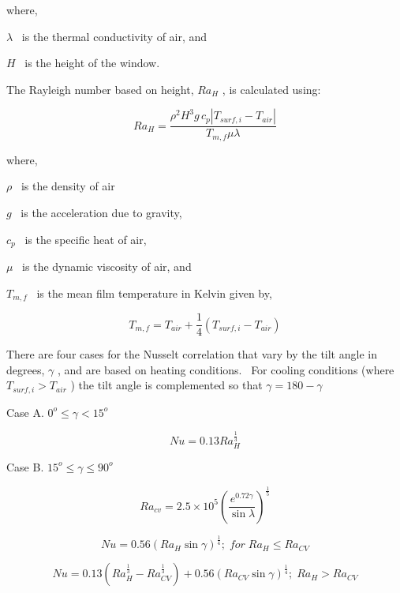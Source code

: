 where,

\(\lambda\) ~is the thermal conductivity of air, and

\(H\) ~is the height of the window.

The Rayleigh number based on height, \(R{a_H}\) , is calculated using:

\begin{equation}
R{a_H} = \frac{{{\rho ^2}{H^3}g\,{c_p}\left| {{T_{surf,i}} - {T_{air}}} \right|}}{{{T_{m,f}}\mu \lambda }}
\end{equation}

where,

\(\rho\) ~is the density of air

\(g\) ~is the acceleration due to gravity,

\({c_p}\) ~is the specific heat of air,

\(\mu\) ~is the dynamic viscosity of air, and

\({T_{m,f}}\) ~is the mean film temperature in Kelvin given by,

\begin{equation}
{T_{m,f}} = {T_{air}} + \frac{1}{4}\left( {{T_{surf,i}} - {T_{air}}} \right)
\end{equation}

There are four cases for the Nusselt correlation that vary by the tilt angle in degrees, \(\gamma\) , and are based on heating conditions.~ For cooling conditions (where \({T_{surf,i}} > {T_{air}}\) ) the tilt angle is complemented so that \(\gamma = 180 - \gamma\)

Case A. \({0^o } \leq \gamma < 15^o\)

\begin{equation}
Nu = 0.13Ra_H^{{\frac{1}{3}}}
\end{equation}

Case B. \(15^o \leq \gamma \leq 90^o\)

\begin{equation}
R{a_{cv}} = 2.5 \times {10^5}{\left( {\frac{{{e^{0.72\gamma }}}}{{\sin \lambda }}} \right)^{{\frac{1}{5}}}}
\end{equation}

\begin{equation}
Nu = 0.56{\left( {R{a_H}\sin \gamma } \right)^{{\frac{1}{4}}}};\;for\;R{a_H} \le R{a_{CV}}
\end{equation}

\begin{equation}
Nu = 0.13\left( {Ra_H^{{\frac{1}{3}}} - Ra_{CV}^{{\frac{1}{3}}}} \right) + 0.56{\left( {R{a_{CV}}\sin \gamma } \right)^{{\frac{1}{4}}}};\;R{a_H} > R{a_{CV}}
\end{equation}

